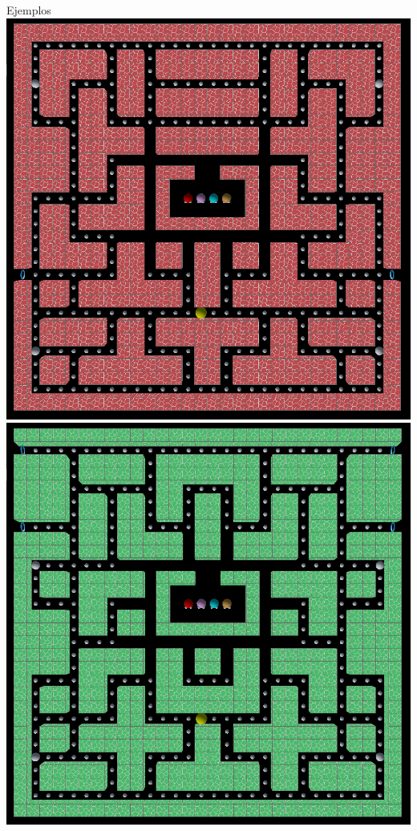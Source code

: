 \documentclass{beamer}
\begin{document}
    \begin{frame}{Ejemplos \scriptsize{\hfill \secname}}
        \centering
        \vspace{3mm}
        \includegraphics[scale=0.15]{img/laberinto1.png}
        \hspace{3mm}
        \includegraphics[scale=0.15]{img/laberinto2.png}
    \end{frame}
    
\end{document}
